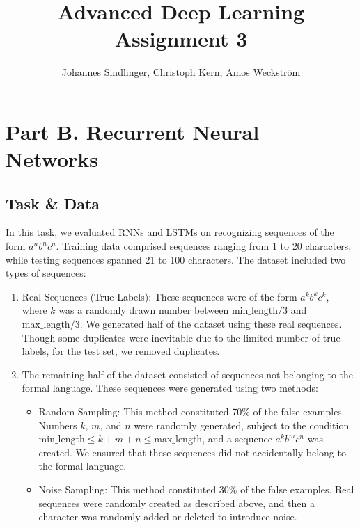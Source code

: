 \documentclass[12pt,a4paper]{article}
\begin{document}
\title{Advanced Deep Learning\\Assignment 3}
\author{Johannes Sindlinger, Christoph Kern, Amos Weckström}
\maketitle

\tableofcontents

\newpage




\section{Part B. Recurrent Neural Networks}

\subsection{Task \& Data}

In this task, we evaluated RNNs and LSTMs on recognizing sequences of the form \(a^nb^nc^n\). Training data comprised sequences ranging from 1 to 20 characters, while testing sequences spanned 21 to 100 characters. The dataset included two types of sequences:
\begin{enumerate}
    \item Real Sequences (True Labels): These sequences were of the form \(a^kb^kc^k\), where \(k\) was a randomly drawn number between \(\text{min\_length}/3\) and \(\text{max\_length}/3\). We generated half of the dataset using these real sequences. Though some duplicates were inevitable due to the limited number of true labels, for the test set, we removed duplicates.
    \item The remaining half of the dataset consisted of sequences not belonging to the formal language. These sequences were generated using two methods:
    \begin{itemize}
        \item Random Sampling: This method constituted 70\% of the false examples. Numbers \(k\), \(m\), and \(n\) were randomly generated, subject to the condition \(\text{min\_length} \leq k+m+n \leq \text{max\_length}\), and a sequence \(a^kb^mc^n\) was created. We ensured that these sequences did not accidentally belong to the formal language.
        \item Noise Sampling: This method constituted 30\% of the false examples. Real sequences were randomly created as described above, and then a character was randomly added or deleted to introduce noise.
    \end{itemize}
\end{enumerate}
\end{document}
